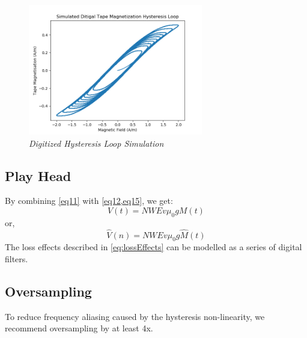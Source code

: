 \documentclass[twoside,a4paper]{article}
\begin{document}
\begin{figure}[ht]
    \center
    \includegraphics[width=3in]{../Simulations/Sim2-M_H.png}
    \caption{\label{flowchart}{\it Digitized Hysteresis Loop Simulation}}
\end{figure}
%
\subsection{Play Head}
By combining \cref{eq11} with \cref{eq12,eq15}, we get:
\begin{equation}
    V(t) =  NWEv \mu_0  g M(t)
\end{equation}
%
or,
\begin{equation}
    \hat{V}(n) =  NWEv \mu_0  g \hat{M}(t)
\end{equation}
%
The loss effects described in \cref{eq:lossEffects}
can be modelled as a series of digital filters.

\subsection{Oversampling}
To reduce frequency aliasing caused by the hysteresis non-linearity,
we recommend oversampling by at least 4x.
%
%
%
%
%
\end{document}
